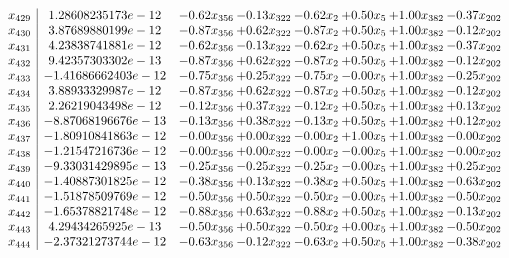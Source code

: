 \documentclass[8pt]{article}
\begin{document}
\[\begin{array}{c| c c@{\hskip 2pt} c@{\hskip 2pt} c@{\hskip 2pt} c@{\hskip 2pt} c@{\hskip 2pt} c@{\hskip 2pt} }
 x_{429}   &  1.28608235173e-12 & -0.62 x_{356} & -0.13 x_{322} & -0.62 x_{2} & +  0.50 x_{5} & +  1.00 x_{382} & -0.37 x_{202}\\
 x_{430}   &  3.87689880199e-12 & -0.87 x_{356} & +  0.62 x_{322} & -0.87 x_{2} & +  0.50 x_{5} & +  1.00 x_{382} & -0.12 x_{202}\\
 x_{431}   &  4.23838741881e-12 & -0.62 x_{356} & -0.13 x_{322} & -0.62 x_{2} & +  0.50 x_{5} & +  1.00 x_{382} & -0.37 x_{202}\\
 x_{432}   &  9.42357303302e-13 & -0.87 x_{356} & +  0.62 x_{322} & -0.87 x_{2} & +  0.50 x_{5} & +  1.00 x_{382} & -0.12 x_{202}\\
 x_{433}   &  -1.41686662403e-12 & -0.75 x_{356} & +  0.25 x_{322} & -0.75 x_{2} & -0.00 x_{5} & +  1.00 x_{382} & -0.25 x_{202}\\
 x_{434}   &  3.88933329987e-12 & -0.87 x_{356} & +  0.62 x_{322} & -0.87 x_{2} & +  0.50 x_{5} & +  1.00 x_{382} & -0.12 x_{202}\\
 x_{435}   &  2.26219043498e-12 & -0.12 x_{356} & +  0.37 x_{322} & -0.12 x_{2} & +  0.50 x_{5} & +  1.00 x_{382} & +  0.13 x_{202}\\
 x_{436}   &  -8.87068196676e-13 & -0.13 x_{356} & +  0.38 x_{322} & -0.13 x_{2} & +  0.50 x_{5} & +  1.00 x_{382} & +  0.12 x_{202}\\
 x_{437}   &  -1.80910841863e-12 & -0.00 x_{356} & +  0.00 x_{322} & -0.00 x_{2} & +  1.00 x_{5} & +  1.00 x_{382} & -0.00 x_{202}\\
 x_{438}   &  -1.21547216736e-12 & -0.00 x_{356} & +  0.00 x_{322} & -0.00 x_{2} & -0.00 x_{5} & +  1.00 x_{382} & -0.00 x_{202}\\
 x_{439}   &  -9.33031429895e-13 & -0.25 x_{356} & -0.25 x_{322} & -0.25 x_{2} & -0.00 x_{5} & +  1.00 x_{382} & +  0.25 x_{202}\\
 x_{440}   &  -1.40887301825e-12 & -0.38 x_{356} & +  0.13 x_{322} & -0.38 x_{2} & +  0.50 x_{5} & +  1.00 x_{382} & -0.63 x_{202}\\
 x_{441}   &  -1.51878509769e-12 & -0.50 x_{356} & +  0.50 x_{322} & -0.50 x_{2} & -0.00 x_{5} & +  1.00 x_{382} & -0.50 x_{202}\\
 x_{442}   &  -1.65378821748e-12 & -0.88 x_{356} & +  0.63 x_{322} & -0.88 x_{2} & +  0.50 x_{5} & +  1.00 x_{382} & -0.13 x_{202}\\
 x_{443}   &  4.29434265925e-13 & -0.50 x_{356} & +  0.50 x_{322} & -0.50 x_{2} & +  0.00 x_{5} & +  1.00 x_{382} & -0.50 x_{202}\\
 x_{444}   &  -2.37321273744e-12 & -0.63 x_{356} & -0.12 x_{322} & -0.63 x_{2} & +  0.50 x_{5} & +  1.00 x_{382} & -0.38 x_{202}\\

\end{array}\]
\end{document}
